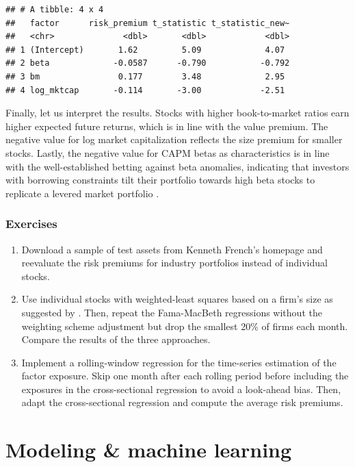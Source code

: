 \documentclass[
]{book}
\providecommand{\tightlist}{%
  \setlength{\itemsep}{0pt}\setlength{\parskip}{0pt}}
\begin{document}
\begin{verbatim}
## # A tibble: 4 x 4
##   factor      risk_premium t_statistic t_statistic_new~
##   <chr>              <dbl>       <dbl>            <dbl>
## 1 (Intercept)       1.62         5.09             4.07 
## 2 beta             -0.0587      -0.790           -0.792
## 3 bm                0.177        3.48             2.95 
## 4 log_mktcap       -0.114       -3.00            -2.51
\end{verbatim}

Finally, let us interpret the results. Stocks with higher book-to-market ratios earn higher expected future returns, which is in line with the value premium. The negative value for log market capitalization reflects the size premium for smaller stocks. Lastly, the negative value for CAPM betas as characteristics is in line with the well-established betting against beta anomalies, indicating that investors with borrowing constraints tilt their portfolio towards high beta stocks to replicate a levered market portfolio \citep{Frazzini2014}.

\hypertarget{exercises-7}{%
\section{Exercises}\label{exercises-7}}

\begin{enumerate}
\def\labelenumi{\arabic{enumi}.}
\tightlist
\item
  Download a sample of test assets from Kenneth French's homepage and reevaluate the risk premiums for industry portfolios instead of individual stocks.
\item
  Use individual stocks with weighted-least squares based on a firm's size as suggested by \citet{Hou2020}. Then, repeat the Fama-MacBeth regressions without the weighting scheme adjustment but drop the smallest 20\% of firms each month. Compare the results of the three approaches.
\item
  Implement a rolling-window regression for the time-series estimation of the factor exposure. Skip one month after each rolling period before including the exposures in the cross-sectional regression to avoid a look-ahead bias. Then, adapt the cross-sectional regression and compute the average risk premiums.
\end{enumerate}

\hypertarget{part-modeling-machine-learning}{%
\part*{Modeling \& machine learning}\label{part-modeling-machine-learning}}
\end{document}
